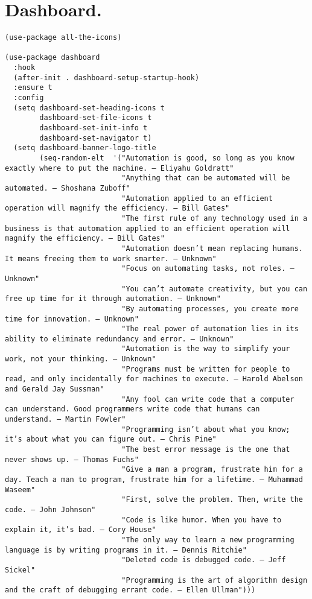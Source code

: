 \documentclass[11pt]{article}
\begin{document}
\section{Dashboard.}
\label{sec:org5c122e5}
\begin{verbatim}
(use-package all-the-icons)

(use-package dashboard
  :hook
  (after-init . dashboard-setup-startup-hook)
  :ensure t
  :config
  (setq dashboard-set-heading-icons t
        dashboard-set-file-icons t
        dashboard-set-init-info t
        dashboard-set-navigator t)
  (setq dashboard-banner-logo-title
        (seq-random-elt  '("Automation is good, so long as you know exactly where to put the machine. – Eliyahu Goldratt"
                           "Anything that can be automated will be automated. – Shoshana Zuboff"
                           "Automation applied to an efficient operation will magnify the efficiency. – Bill Gates"
                           "The first rule of any technology used in a business is that automation applied to an efficient operation will magnify the efficiency. – Bill Gates"
                           "Automation doesn’t mean replacing humans. It means freeing them to work smarter. – Unknown"
                           "Focus on automating tasks, not roles. – Unknown"
                           "You can’t automate creativity, but you can free up time for it through automation. – Unknown"
                           "By automating processes, you create more time for innovation. – Unknown"
                           "The real power of automation lies in its ability to eliminate redundancy and error. – Unknown"
                           "Automation is the way to simplify your work, not your thinking. – Unknown"
                           "Programs must be written for people to read, and only incidentally for machines to execute. – Harold Abelson and Gerald Jay Sussman"
                           "Any fool can write code that a computer can understand. Good programmers write code that humans can understand. – Martin Fowler"
                           "Programming isn’t about what you know; it’s about what you can figure out. – Chris Pine"
                           "The best error message is the one that never shows up. – Thomas Fuchs"
                           "Give a man a program, frustrate him for a day. Teach a man to program, frustrate him for a lifetime. – Muhammad Waseem"
                           "First, solve the problem. Then, write the code. – John Johnson"
                           "Code is like humor. When you have to explain it, it’s bad. – Cory House"
                           "The only way to learn a new programming language is by writing programs in it. – Dennis Ritchie"
                           "Deleted code is debugged code. – Jeff Sickel"
                           "Programming is the art of algorithm design and the craft of debugging errant code. – Ellen Ullman")))


\end{verbatim}
\end{document}
